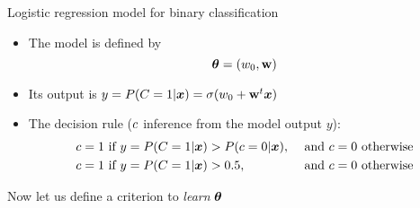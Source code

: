 \begin{frame}{Logistic regression model for binary classification}
  \begin{itemize}
  \item The model is defined by $$ \boldsymbol{\theta} = (w_0 , \mathbf{w})$$
  \item Its output is $y = P({C}=1|\boldsymbol{x}) = \sigma(w_0 + \mathbf{w}^t\boldsymbol{x})$
  \item The decision rule (${c}$ inference from the model output $y$):
    \begin{align*}
      c=1 &\textrm{ if } y = P({C}=1|\boldsymbol{x}) > P({c}=0|\boldsymbol{x}), &\textrm{ and } c=0 \textrm{ otherwise}\\
      c=1 &\textrm{ if } y = P({C}=1|\boldsymbol{x}) > 0.5, &\textrm{ and } c=0 \textrm{ otherwise}
    \end{align*}
\end{itemize}
\begin{center}
Now let us define a criterion to \textit{learn} $\boldsymbol{\theta}$
\end{center}
\end{frame}



